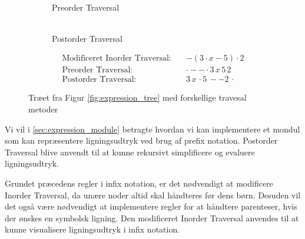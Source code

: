 \documentclass{article}
\begin{document}
\begin{figure}[H]
\begin{subfigure}{0.3\textwidth}
    \caption{\\Preorder Traversal}
  \end{subfigure}
  \hfill
  \begin{subfigure}{0.3\textwidth}
    \centering
    \caption{\\Postorder Traversal}
  \end{subfigure}
  \begin{align*}
      \text{Modificeret Inorder Traversal:} \quad & - (3 \cdot x - 5) \cdot 2 \\
      \text{Preorder Traversal:} \quad &  \cdot - - \cdot 3\, x\, 5\, 2  \\
      \text{Postorder Traversal:} \quad & 3\, x\, \cdot 5\, - -  2\, \cdot
  \end{align*}
  \caption{Træet fra Figur \ref{fig:expression_tree} med forskellige travesal metoder}
  \label{fig:expression_tree_traversal}
\end{figure}


Vi vil i \ref{sec:expression_module} betragte hvordan vi kan implementere et mondul som kan repræsentere ligningsudtryk ved brug af prefix notation.
Postorder Traversal blive anvendt til at kunne rekursivt simplificere og evaluere ligningsudtryk.

Grundet præcedens regler i infix notation, er det nødvendigt at modificere Inorder Traversal, da unære noder altid skal håndteres før dens børn. Desuden vil det også være nødvendigt at implementere regler for at håndtere parenteser, hvis der ønskes en symbolsk ligning. Den modificeret Inorder Traversal anvendes til at kunne visualisere ligningsudtryk i infix notation.
\end{document}
